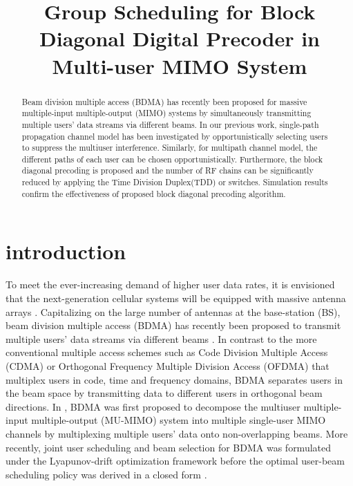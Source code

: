 \documentclass[conference]{IEEEtran}
\begin{document}
	\title{Group Scheduling for Block Diagonal Digital Precoder in Multi-user MIMO System}
	\author{}
	
	
\maketitle \thispagestyle{plain}

\begin{abstract}
	Beam division multiple access (BDMA) has recently been proposed for massive multiple-input multiple-output (MIMO) systems by simultaneously transmitting multiple users' data streams via different beams. In our previous work, single-path propagation channel model has been investigated by opportunistically selecting users to suppress the multiuser interference. Similarly, for multipath channel model, the different paths of each user can be chosen opportunistically. Furthermore, the block diagonal precoding is proposed and the number of RF chains can be significantly reduced by applying the Time Division Duplex(TDD) or switches. Simulation results confirm the effectiveness of proposed block diagonal precoding algorithm.
\end{abstract}

\section{introduction}
To meet the ever-increasing demand of higher user data rates, it is envisioned that the next-generation cellular systems will be equipped with massive antenna arrays \cite{boccardi2014five}. Capitalizing on the large number of antennas at the base-station (BS), beam division multiple access (BDMA) has recently been proposed to transmit multiple users' data streams via different beams \cite{sun2015beam, Jiang2018}. In contrast to the more conventional multiple access schemes such as Code Division Multiple Access (CDMA) or Orthogonal Frequency Multiple Division Access (OFDMA) that multiplex users in code, time and frequency domains, BDMA separates users in the beam space by transmitting data to different users in orthogonal beam directions. In \cite{sun2015beam}, BDMA was first proposed to decompose the multiuser multiple-input multiple-output (MU-MIMO) system into multiple single-user MIMO channels by multiplexing multiple users' data onto non-overlapping beams. More recently, joint user scheduling and beam selection for BDMA was formulated under the Lyapunov-drift optimization framework before the optimal user-beam scheduling policy was derived in a closed form \cite{Jiang2018}.
\end{document}
